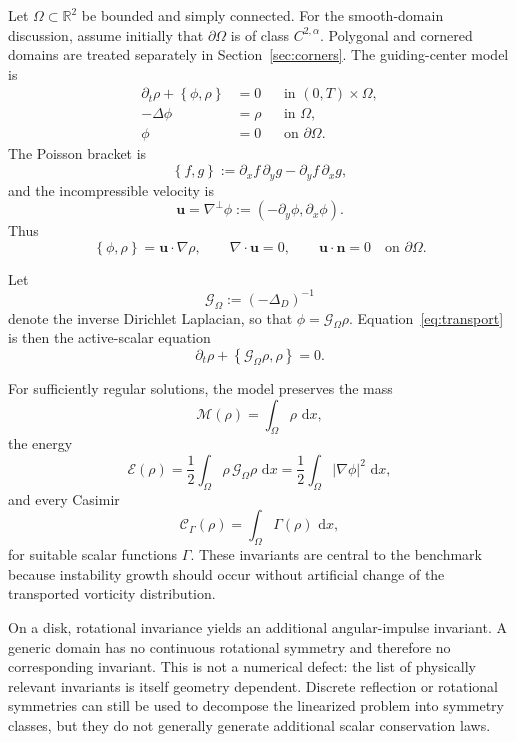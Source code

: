 \documentclass[11pt,a4paper]{article}
\newcommand{\R}{\mathbb{R}}
\newcommand{\Om}{\Omega}
\newcommand{\dd}{\,\mathrm{d}}
\newcommand{\bracket}[2]{\left\{#1,#2\right\}}
\newcommand{\abs}[1]{\left|#1\right|}
\newcommand{\G}{\mathcal{G}_{\Om}}
\begin{document}
Let $\Om\subset\R^2$ be bounded and simply connected. For the smooth-domain discussion, assume initially that $\partial\Om$ is of class $C^{2,\alpha}$. Polygonal and cornered domains are treated separately in Section~\ref{sec:corners}. The guiding-center model is
\begin{align}
  \partial_t\rho+\bracket{\phi}{\rho}&=0
  &&\text{in }(0,T)\times\Om, \label{eq:transport}\\
  -\Delta\phi&=\rho
  &&\text{in }\Om, \label{eq:poisson}\\
  \phi&=0
  &&\text{on }\partial\Om. \label{eq:dirichlet}
\end{align}
The Poisson bracket is
\[
  \bracket{f}{g}
  :=
  \partial_xf\,\partial_yg-
  \partial_yf\,\partial_xg,
\]
and the incompressible velocity is
\[
  \mathbf{u}=\nabla^\perp\phi:=(-\partial_y\phi,\partial_x\phi).
\]
Thus
\[
  \bracket{\phi}{\rho}=\mathbf{u}\cdot\nabla\rho,
  \qquad
  \nabla\cdot\mathbf{u}=0,
  \qquad
  \mathbf{u}\cdot\mathbf{n}=0\quad\text{on }\partial\Om.
\]

Let
\[
  \G:=(-\Delta_D)^{-1}
\]
denote the inverse Dirichlet Laplacian, so that $\phi=\G\rho$. Equation~\eqref{eq:transport} is then the active-scalar equation
\begin{equation}
  \partial_t\rho+\bracket{\G\rho}{\rho}=0.
  \label{eq:active-scalar}
\end{equation}

For sufficiently regular solutions, the model preserves the mass
\begin{equation}
  \mathcal{M}(\rho)=\int_\Om\rho\,\dd x,
  \label{eq:mass}
\end{equation}
the energy
\begin{equation}
  \mathcal{E}(\rho)
  =\frac12\int_\Om\rho\,\G\rho\,\dd x
  =\frac12\int_\Om\abs{\nabla\phi}^2\,\dd x,
  \label{eq:energy}
\end{equation}
and every Casimir
\begin{equation}
  \mathcal{C}_{\Gamma}(\rho)
  =\int_\Om\Gamma(\rho)\,\dd x,
  \label{eq:casimir}
\end{equation}
for suitable scalar functions $\Gamma$. These invariants are central to the benchmark because instability growth should occur without artificial change of the transported vorticity distribution.

On a disk, rotational invariance yields an additional angular-impulse invariant. A generic domain has no continuous rotational symmetry and therefore no corresponding invariant. This is not a numerical defect: the list of physically relevant invariants is itself geometry dependent. Discrete reflection or rotational symmetries can still be used to decompose the linearized problem into symmetry classes, but they do not generally generate additional scalar conservation laws.
\end{document}
